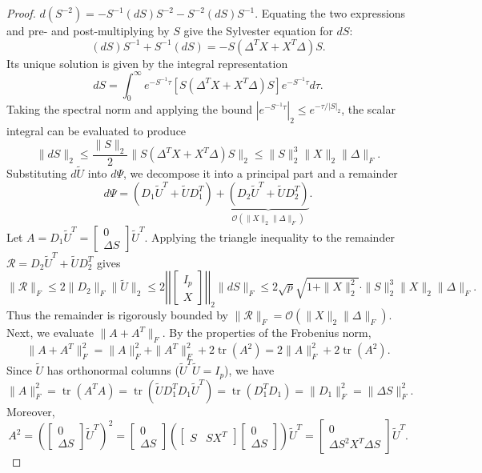 \documentclass[10pt,a4paper]{amsart}
\begin{document}
\begin{proof}
$ d(S^{-2})  = -S^{-1}(dS)S^{-2} - S^{-2}(dS)S^{-1}. $
Equating the two expressions and pre- and post-multiplying by $S$ give the Sylvester equation for $dS$:
$$ (dS)S^{-1} + S^{-1}(dS) = -S(\Delta^T X + X^T \Delta)S. $$
Its unique solution is given by the integral representation
$$ dS = \int_0^\infty e^{-S^{-1}\tau} [S(\Delta^T X + X^T \Delta)S] e^{-S^{-1}\tau} d\tau. $$
Taking the spectral norm and applying the bound $|e^{-S^{-1}\tau}|_2 \le e^{-\tau/|S|_2}$, the scalar integral can be evaluated to produce
$$ \|dS\|_2 \le \frac{\|S\|_2}{2} \|S(\Delta^T X + X^T \Delta)S\|_2 \le \|S\|_2^3 \|X\|_2 \|\Delta\|_F. $$
Substituting $d\tilde{U}$ into $d\Psi$, we decompose it into a principal part and a remainder
$$ d\Psi = (D_1 \tilde{U}^T + \tilde{U} D_1^T) + \underbrace{(D_2 \tilde{U}^T + \tilde{U} D_2^T)}_{\mathcal{O}(\|X\|_2\|\Delta\|_F)}. $$
Let $A = D_1 \tilde{U}^T = \begin{bmatrix} 0 \\ \Delta S \end{bmatrix} \tilde{U}^T$. Applying the triangle inequality to the remainder $\mathcal{R} = D_2 \tilde{U}^T + \tilde{U} D_2^T$ gives 
$$ \|\mathcal{R}\|_F \le 2 \|D_2\|_F \|\tilde{U}\|_2 \le 2 \left|\left| \begin{bmatrix} I_p \\ X \end{bmatrix} \right|\right|_2 \|dS\|_F \le 2\sqrt{p} \sqrt{1 + \|X\|_2^2} \cdot \|S\|_2^3 \|X\|_2 \|\Delta\|_F. $$
Thus the remainder is rigorously bounded by $\|\mathcal{R}\|_F = \mathcal{O}(\|X\|_2\|\Delta\|_F)$.  Next, we evaluate $\|A + A^T\|_F$. By the properties of the Frobenius norm,
\begin{equation}\label{eq:a_plus_at_norm}
\|A + A^T\|_F^2 = \|A\|_F^2 + \|A^T\|_F^2 + 2\operatorname{tr}(A^2) = 2\|A\|_F^2 + 2\operatorname{tr}(A^2).
\end{equation}
Since $\widetilde U$ has orthonormal columns ($\widetilde U^T \widetilde U = I_p$), we have $$\|A\|_F^2 = \operatorname{tr}(A^T A) = \operatorname{tr}(\widetilde U D_1^T D_1 \widetilde U^T) = \operatorname{tr}(D_1^T D_1) = \|D_1\|_F^2 = \|\Delta S\|_F^2.$$
Moreover, 
 $$
A^2 = \left( \begin{bmatrix} 0 \\ \Delta S \end{bmatrix} \widetilde U^T \right)^2 = \begin{bmatrix} 0 \\ \Delta S \end{bmatrix} \left( \begin{bmatrix} S & S X^T \end{bmatrix} \begin{bmatrix} 0 \\ \Delta S \end{bmatrix} \right) \widetilde U^T = \begin{bmatrix} 0 \\ \Delta S^2 X^T \Delta S \end{bmatrix} \widetilde U^T.
$$
\end{proof}
\end{document}
